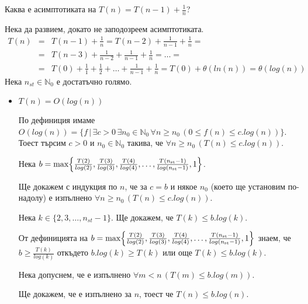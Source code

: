 \begin{problem}
	Каква е асимптотиката на $T(n)=T(n-1)+\frac1n$?
\end{problem}
\begin{solution}
	Нека да развием, докато не заподозреем асимптотиката.
	\begin{eqnarray*}
		T(n)
		&=& T(n-1)+\frac1n=T(n-2)+\frac1{n-1}+\frac1n=\\
		&=& T(n-3)+\frac1{n-2}+\frac1{n-1}+\frac1n=\dots=\\
		&=& T(0)+\frac11+\frac12+\dots+\frac1{n-1}+\frac1n=T(0)+\theta(ln(n))=\theta(log(n))
	\end{eqnarray*}
	Нека $n_{st}\in\mathbb{N}_0$ е достатъчно голямо.
	
	\begin{itemize}
		\item $T(n)=O(log(n))$
		
		По $\hyperref[bdef-asymp-classes]{\text{дефиниция}}$ имаме $O(log(n))=\{f\,|\,\exists c>0\,\exists n_0\in\mathbb{N}_0\,\forall n\ge n_0\,(0\le f(n)\le c.log(n))\}$. Тоест търсим $c>0$ и $n_0\in\mathbb{N}_0$ такива, че $\forall n\ge n_0\,(T(n)\le c.log(n))$.
		
		Нека $b=\max\Bigl\{\frac{T(2)}{log(2)},\frac{T(3)}{log(3)},\frac{T(4)}{log(4)},\dots,\frac{T(n_{\text{st}}-1)}{log({n_{\text{st}}-1)}},1\Bigr\}$.%
		
		Ще докажем с индукция по $n$, че за $c=b$ и някое $n_0$ (което ще установим по-надолу) е изпълнено $\forall n\ge n_0\,(T(n)\le c.log(n))$.
		
		\begin{base}
			Нека $k\in\{2,3,\dots,n_{st}-1\}$. Ще докажем, че $T(k)\le b.log(k)$.
			
			От дефиницията на $b=\max\Bigl\{\frac{T(2)}{log(2)},\frac{T(3)}{log(3)},\frac{T(4)}{log(4)},\dots,\frac{T(n_{\text{st}}-1)}{log({n_{\text{st}}-1)}},1\Bigr\}$ знаем, че $b\ge \frac{T(k)}{log(k)}$ откъдето $b.log(k)\ge T(k)$ или още $T(k)\le b.log(k)$.
		\end{base}
	
		\begin{indhypothesis}
			Нека допуснем, че е изпълнено $\forall m<n\,(T(m)\le b.log(m))$.
		\end{indhypothesis}
	
		\begin{indstep}
			Ще докажем, че е изпълнено за $n$, тоест че $T(n)\le b.log(n)$.
			

\end{indstep}
\end{itemize}
\end{solution}
